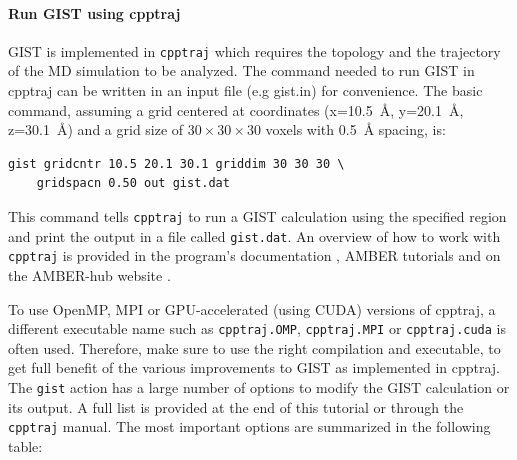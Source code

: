 \documentclass[9pt,tutorial]{livecoms}
\newcommand{\software}{\texttt}
\newcommand\inlinecode{\texttt}
\begin{document}
\paragraph{Run GIST using cpptraj}
GIST is implemented in \software{cpptraj} which requires the topology and the trajectory of the MD simulation to be analyzed.
The command needed to run GIST in cpptraj can be written in an input file (e.g gist.in) for convenience. The basic command, assuming a grid centered at coordinates (x=\SI{10.5}{\angstrom}, y=\SI{20.1}{\angstrom}, z=\SI{30.1}{\angstrom}) and a grid size of $30\times30\times30$ voxels with \SI{0.5}{\angstrom} spacing, is:

\begin{lstlisting}[style=cpptraj]
gist gridcntr 10.5 20.1 30.1 griddim 30 30 30 \
	gridspacn 0.50 out gist.dat
\end{lstlisting}
This command tells \software{cpptraj} to run a GIST calculation using the specified region and print the output in a file called \inlinecode{gist.dat}.  An overview of how to work with \software{cpptraj} is provided in the program's documentation \cite{cpptraj_doc}, AMBER tutorials \cite{amber_tut_cpptraj} and on the AMBER-hub website \cite{amber_hub}.

To use OpenMP, MPI or GPU-accelerated (using CUDA) versions of cpptraj, a different executable name such as \inlinecode{cpptraj.OMP}, \inlinecode{cpptraj.MPI} or \inlinecode{cpptraj.cuda} is often used.
Therefore, make sure to use the right compilation and executable, to get full benefit of the various improvements to GIST as implemented in cpptraj.
The \inlinecode{gist} action has a large number of options to modify the GIST calculation or its output.
A full list is provided at the end of this tutorial or through the \software{cpptraj} manual.
The most important options are summarized in the following table:
\end{document}
